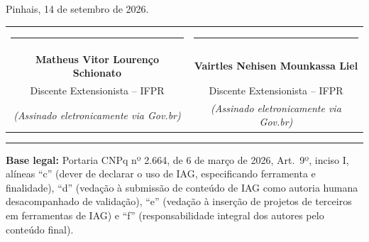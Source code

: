 \bigskip
\noindent
Pinhais, 14 de setembro de 2026.

\bigskip\bigskip
\noindent
\begin{center}
\begin{tabular}{cc}
\rule{6.5cm}{0.5pt} & \rule{6.5cm}{0.5pt} \\
\textbf{Matheus Vitor Lourenço Schionato} & \textbf{Vairtles Nehisen Mounkassa Liel} \\
Discente Extensionista -- IFPR & Discente Extensionista -- IFPR \\
\footnotesize\textit{(Assinado eletronicamente via Gov.br)} & \footnotesize\textit{(Assinado eletronicamente via Gov.br)}
\end{tabular}
\end{center}

\bigskip
\begin{center}
\end{center}

\bigskip
\noindent\rule{\textwidth}{0.4pt}
\footnotesize
\noindent
\textbf{Base legal:} Portaria CNPq nº 2.664, de 6 de março de 2026, Art.~9º, inciso I,
alíneas ``c'' (dever de declarar o uso de IAG, especificando ferramenta e finalidade),
``d'' (vedação à submissão de conteúdo de IAG como autoria humana desacompanhado de validação),
``e'' (vedação à inserção de projetos de terceiros em ferramentas de IAG) e ``f''
(responsabilidade integral dos autores pelo conteúdo final).
\normalsize
